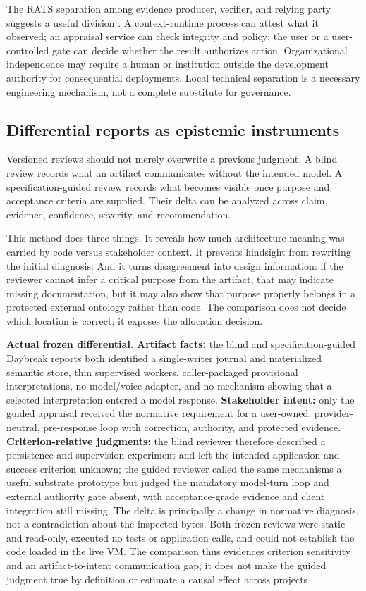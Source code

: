 \documentclass[10pt,a4paper]{article}
\begin{document}
The RATS separation among evidence producer, verifier, and relying party suggests a useful division \cite{rfc9334}. A context-runtime process can attest what it observed; an appraisal service can check integrity and policy; the user or a user-controlled gate can decide whether the result authorizes action. Organizational independence may require a human or institution outside the development authority for consequential deployments. Local technical separation is a necessary engineering mechanism, not a complete substitute for governance.

\subsection{Differential reports as epistemic instruments}

Versioned reviews should not merely overwrite a previous judgment. A blind review records what an artifact communicates without the intended model. A specification-guided review records what becomes visible once purpose and acceptance criteria are supplied. Their delta can be analyzed across claim, evidence, confidence, severity, and recommendation.

This method does three things. It reveals how much architecture meaning was carried by code versus stakeholder context. It prevents hindsight from rewriting the initial diagnosis. And it turns disagreement into design information: if the reviewer cannot infer a critical purpose from the artifact, that may indicate missing documentation, but it may also show that purpose properly belongs in a protected external ontology rather than code. The comparison does not decide which location is correct; it exposes the allocation decision.

\noindent\textbf{Actual frozen differential.} \textbf{Artifact facts:} the blind and specification-guided Daybreak reports both identified a single-writer journal and materialized semantic store, thin supervised workers, caller-packaged provisional interpretations, no model/voice adapter, and no mechanism showing that a selected interpretation entered a model response. \textbf{Stakeholder intent:} only the guided appraisal received the normative requirement for a user-owned, provider-neutral, pre-response loop with correction, authority, and protected evidence. \textbf{Criterion-relative judgments:} the blind reviewer therefore described a persistence-and-supervision experiment and left the intended application and success criterion unknown; the guided reviewer called the same mechanisms a useful substrate prototype but judged the mandatory model-turn loop and external authority gate absent, with acceptance-grade evidence and client integration still missing. The delta is principally a change in normative diagnosis, not a contradiction about the inspected bytes. Both frozen reviews were static and read-only, executed no tests or application calls, and could not establish the code loaded in the live VM. The comparison thus evidences criterion sensitivity and an artifact-to-intent communication gap; it does not make the guided judgment true by definition or estimate a causal effect across projects \cite{daybreakblind,daybreakguided}.
\end{document}
